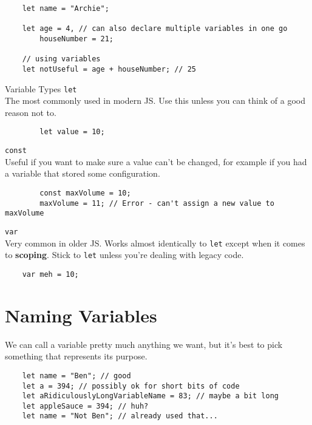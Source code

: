 \begin{verbatim}
    let name = "Archie";

    let age = 4, // can also declare multiple variables in one go
        houseNumber = 21;

    // using variables
    let notUseful = age + houseNumber; // 25
\end{verbatim}


\pagebreak

\begin{infobox}{Variable Types}
    \texttt{let}\\
    The most commonly used in modern JS. Use this unless you can think of a good reason not to.

    \begin{verbatim}
        let value = 10;
    \end{verbatim}

    \texttt{const}\\
    Useful if you want to make sure a value can't be changed, for example if you had a variable that stored some configuration.

    \begin{verbatim}
        const maxVolume = 10;
        maxVolume = 11; // Error - can't assign a new value to maxVolume
    \end{verbatim}

    \texttt{var}\\
    Very common in older JS. Works almost identically to \texttt{let} except when it comes to \textbf{scoping}. Stick to \texttt{let} unless you're dealing with legacy code.

    \begin{verbatim}
    var meh = 10;
    \end{verbatim}

\end{infobox}



\section{Naming Variables}

We can call a variable pretty much anything we want, but it's best to pick something that represents its purpose.

\begin{verbatim}
    let name = "Ben"; // good
    let a = 394; // possibly ok for short bits of code
    let aRidiculouslyLongVariableName = 83; // maybe a bit long
    let appleSauce = 394; // huh?
    let name = "Not Ben"; // already used that...
\end{verbatim}

